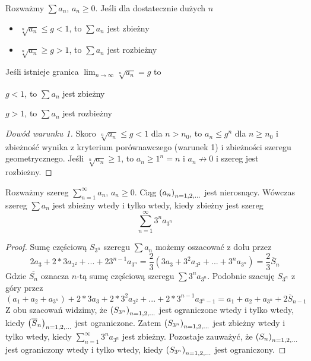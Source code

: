 \documentclass[9pt]{article}
\begin{document}
\begin{Twi}
    Rozważmy $\sum a_n$, $a_n \ge 0$. Jeśli dla dostatecznie dużych $n$    
   \begin{description}
        \item[Wersja 1]
            \begin{itemize}
                \item $\sqrt[n]{a_n} \le g < 1$, to $\sum a_n$ jest zbieżny
                \item $\sqrt[n]{a_n} \ge g > 1$, to $\sum a_n$ jest rozbieżny
            \end{itemize}
        \item[Wersja 2]
            Jeśli istnieje granica $\lim_{n \to \infty} \sqrt[n]{a_n} = g$ to
                \item $g < 1$, to $\sum a_n$ jest zbieżny
                \item $g > 1$, to $\sum a_n$ jest rozbieżny
   \end{description}
\end{Twi}

\begin{proof}[Dowód warunku 1]
    Skoro $\sqrt[n]{a_n} \le g < 1$ dla $n > n_0$, to $a_n \le g^n$ dla $n \ge n_0$ i zbieżność
    wynika z kryterium porównawczego (warunek 1) i zbieżności szeregu geometrycznego. Jeśli
    $\sqrt[n]{a_n} \ge 1$, to $a_n \ge 1^n = n$ i $a_n \not\to 0$ i szereg jest rozbieżny.
\end{proof}

\begin{Twi}
    Rozważmy szereg $\sum_{n = 1}^\infty a_n$, $a_n \ge 0$. Ciąg $\left(a_n\right)_{n = 1,2,...}$ jest nierosnący.
    Wówczas szereg $\sum a_n$ jest zbieżny wtedy i tylko wtedy, kiedy zbieżny jest szereg
    \[
        \sum_{n = 1}^\infty 3^n a_{3^n}
    \]
\end{Twi}
\begin{proof}
    Sumę częściową $S_{3^n}$ szeregu $\sum a_n$ możemy oszacować z dołu przez
    \[
        2 a_3 + 2 *3a_{3^2} + ... + 2 3^{n-1} a_{3^n} =
        \frac{2}{3} 
        \left(
        3 a_3 + 3^2 a_{3^2} + ... + 3^{n} a_{3^n}
        \right)
        = \frac{2}{3} \overline{S}_n
    \]
    Gdzie $\overline{S_n}$ oznacza $n$-tą sumę częściową szeregu $\sum 3^n a_{3^n}$. Podobnie
    szacuję $S_{3^n}$ z góry przez
    \[
        (a_1 + a_2 + a_{3^n}) + 2 * 3 a_3 + 2* 3^2 a_{3^2} + ... + 2 * 3^{n-1}a_{3^n-1}
        =
        a_1 + a_2 + a_{3^n} + 2 \overline{S}_{n-1}
    \]
    Z obu szacowań widzimy, że $\left(S_{3^n}\right)_{n = 1,2,...}$ jest ograniczone wtedy i tylko wtedy, kiedy
    $\left(\overline{S}_n\right)_{n = 1,2,...}$ jest ograniczone. Zatem $\left(S_{3^n}\right)_{n = 1,2,...}$ jest zbieżny wtedy i tylko wtedy,
    kiedy $\sum_{n = 1}^{\infty} 3^n a_{3^n}$ jest zbieżny. Pozostaje zauważyć, że $\left(S_n\right)_{n = 1,2,...}$ jest
    ograniczony wtedy i tylko wtedy, kiedy $\left(S_{3^n}\right)_{n = 1,2,...}$ jest ograniczony.
\end{proof}
\end{document}
